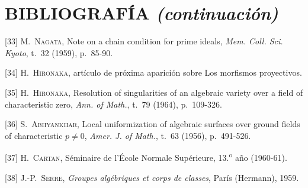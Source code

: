\clearpage
{}
{}
\section*{BIBLIOGRAFÍA \textnormal{\emph{(continuación)}}}

\begingroup
\small
\setlength{\parindent}{0pt}
\setlength{\parskip}{4pt}

[33] M.~\textsc{Nagata}, Note on a chain condition for prime
ideals, \emph{Mem. Coll. Sci. Kyoto}, t.~32 (1959), p.~85-90.

[34] H.~\textsc{Hironaka}, artículo de próxima aparición sobre
Los morfismos proyectivos.

[35] H.~\textsc{Hironaka}, Resolution of singularities of an
algebraic variety over a field of characteristic zero, \emph{Ann. of Math.},
t.~79 (1964), p.~109-326.

[36] S.~\textsc{Abhyankhar}, Local uniformization of algebraic
surfaces over ground fields of characteristic $p\ne0$, \emph{Amer. J. of
Math.}, t.~63 (1956), p.~491-526.

[37] H.~\textsc{Cartan}, Séminaire de l'École Normale
Supérieure, 13.\textsuperscript{o} año (1960-61).

[38] J.-P.~\textsc{Serre}, \emph{Groupes algébriques et corps de
classes}, París (Hermann), 1959.

\endgroup

